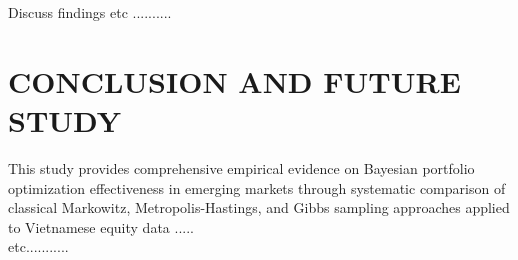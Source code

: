 \documentclass[12pt,a4paper,oneside]{book}
\theoremstyle{definition}
\begin{document}
Discuss findings etc ..........\\




\chapter{CONCLUSION AND FUTURE STUDY}
\label{ch5}

This study provides comprehensive empirical evidence on Bayesian portfolio optimization effectiveness in emerging markets through systematic comparison of classical Markowitz, Metropolis-Hastings, and Gibbs sampling approaches applied to Vietnamese equity data ..... \\

etc...........



\end{document}
